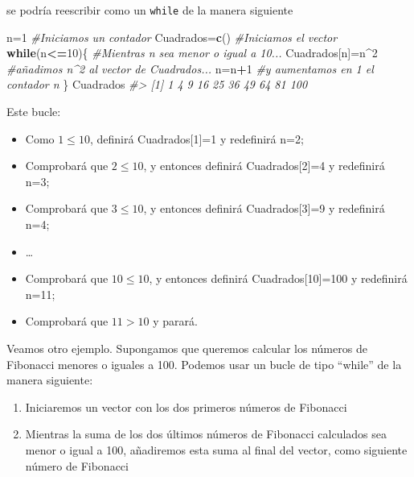 \documentclass[
]{book}
\newenvironment{Shaded}{\begin{snugshade}}{\end{snugshade}}
\newcommand{\CommentTok}[1]{\textcolor[rgb]{0.56,0.35,0.01}{\textit{#1}}}
\newcommand{\ControlFlowTok}[1]{\textcolor[rgb]{0.13,0.29,0.53}{\textbf{#1}}}
\newcommand{\DecValTok}[1]{\textcolor[rgb]{0.00,0.00,0.81}{#1}}
\newcommand{\KeywordTok}[1]{\textcolor[rgb]{0.13,0.29,0.53}{\textbf{#1}}}
\newcommand{\NormalTok}[1]{#1}
\newcommand{\OperatorTok}[1]{\textcolor[rgb]{0.81,0.36,0.00}{\textbf{#1}}}
\providecommand{\tightlist}{%
  \setlength{\itemsep}{0pt}\setlength{\parskip}{0pt}}
\theoremstyle{definition}
\theoremstyle{definition}
\theoremstyle{definition}
\theoremstyle{remark}
\begin{document}
se podría reescribir como un \texttt{while} de la manera siguiente

\begin{Shaded}
\begin{Highlighting}[]
\NormalTok{n=}\DecValTok{1} \CommentTok{\#Iniciamos un contador}
\NormalTok{Cuadrados=}\KeywordTok{c}\NormalTok{() }\CommentTok{\#Iniciamos el vector}
\ControlFlowTok{while}\NormalTok{(n}\OperatorTok{\textless{}=}\DecValTok{10}\NormalTok{)\{ }\CommentTok{\#Mientras n sea menor o igual a 10...}
\NormalTok{  Cuadrados[n]=n}\OperatorTok{\^{}}\DecValTok{2} \CommentTok{\#añadimos n\^{}2 al vector de Cuadrados...}
\NormalTok{  n=n}\OperatorTok{+}\DecValTok{1} \CommentTok{\#y aumentamos en 1 el contador n}
\NormalTok{\}}
\NormalTok{Cuadrados}
\CommentTok{\#\textgreater{}  [1]   1   4   9  16  25  36  49  64  81 100}
\end{Highlighting}
\end{Shaded}

Este bucle:

\begin{itemize}
\tightlist
\item
  Como \(1\leqslant 10\), definirá Cuadrados{[}1{]}=1 y redefinirá n=2;
\item
  Comprobará que \(2\leqslant 10\), y entonces definirá Cuadrados{[}2{]}=4 y redefinirá n=3;
\item
  Comprobará que \(3\leqslant 10\), y entonces definirá Cuadrados{[}3{]}=9 y redefinirá n=4;
\item
  \ldots{}
\item
  Comprobará que \(10\leqslant 10\), y entonces definirá Cuadrados{[}10{]}=100 y redefinirá n=11;
\item
  Comprobará que \(11>10\) y parará.
\end{itemize}

Veamos otro ejemplo. Supongamos que queremos calcular los números de Fibonacci menores o iguales a 100. Podemos usar un bucle de tipo ``while'' de la manera siguiente:

\begin{enumerate}
\def\labelenumi{\arabic{enumi}.}
\tightlist
\item
  Iniciaremos un vector con los dos primeros números de Fibonacci
\item
  Mientras la suma de los dos últimos números de Fibonacci calculados sea menor o igual a 100, añadiremos esta suma al final del vector, como siguiente número de Fibonacci
\end{enumerate}
\end{document}

